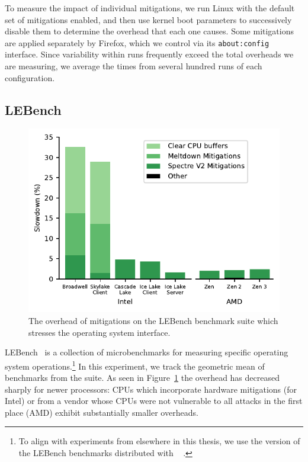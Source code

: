 To measure the impact of individual mitigations, we run  Linux with the default set of mitigations enabled, and then use kernel boot parameters to successively disable them to determine the overhead that each one causes.
Some mitigations are applied separately by Firefox, which we control via its \texttt{about:config} interface.
Since variability within runs frequently exceed the total overheads we are measuring, we average the times from several hundred runs of each configuration.


\subsection{LEBench}

\begin{figure}[t]
    \includegraphics[width=\columnwidth]{plots/lebench.pdf}
    \caption{The overhead of mitigations on the LEBench benchmark suite which stresses the operating system interface.}
    \label{fig:lebench}
\end{figure}


LEBench~\cite{ren:lebench} is a collection of microbenchmarks for measuring specific operating system operations.\footnote{To align with experiments from elsewhere in this thesis, we use the version of the LEBench benchmarks distributed with \sys~\cite{behrens:ward} .}
In this experiment, we track the geometric mean of benchmarks from the suite.
As seen in Figure~\ref{fig:lebench} the overhead has decreased sharply for newer processors:
CPUs which incorporate hardware mitigations (for Intel) or from a vendor whose CPUs were not vulnerable to all attacks in the first place (AMD) exhibit substantially smaller overheads.

